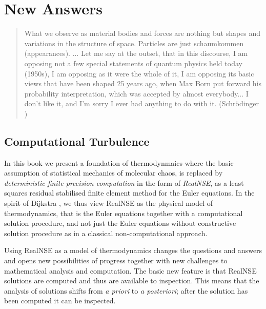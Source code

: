  
\iffalse  %
\chapter{New Answers}
\small
\begin{quote}
What we observe as material bodies and forces are nothing but shapes and 
variations in the structure of space.
Particles are just schaumkommen (appearances). ...
Let me say at the outset, that in this discourse, I am opposing not a few 
special statements of quantum physics held today (1950s), I am opposing 
as it were the whole of it, I am opposing its basic views that have been 
shaped 25 years ago, when Max Born put forward his probability 
interpretation, which was accepted by almost everybody...
I don't like it, and I'm sorry I ever had anything to do with it. 
(Schr\"odinger \cite{schrodinger2})
\end{quote} 
\normalsize
 
\section{Computational Turbulence}   

In this book we present a foundation of thermodynmaics
where the basic assumption of statistical mechanics of
molecular chaos, is replaced by 
\emph{deterministic finite precision computation} in the form of \emph{RealNSE}, as 
a least squares residual stabilised finite element method for the Euler equations.
In the spirit of Dijkstra \cite{dijkstra}, we thus view RealNSE as the 
physical model of thermodynamics, that is the Euler equations
together with a computational solution procedure, and not just
the Euler equations without constructive solution procedure
as in a classical non-computational approach. 

Using RealNSE as a model of thermodynamics changes the questions 
and answers and opens new possibilities of progress together with
new challenges to mathematical analysis and computation.
The basic new feature is that RealNSE solutions are computed and thus 
are available to inspection. This means that the analysis of solutions 
shifts from \emph{a priori} to \emph{a posteriori}; after the solution
has been computed it can be inspected.

